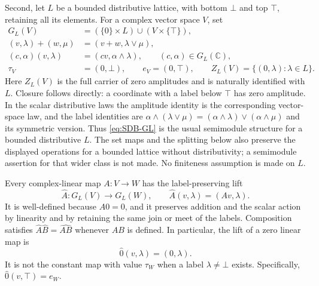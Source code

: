 Second, let $L$ be a bounded distributive lattice, with bottom
$\bot$ and top $\top$, retaining all its elements. For a complex
vector space $V$, set
\begin{equation}\tag{SDB33}\label{eq:SDB-GL}
 \begin{aligned}
 G_L(V)&=(\{0\}\times L)\cup(V\times\{\top\}),\\
 (v,\lambda)+(w,\mu)&=(v+w,\lambda\vee\mu),\\
 (c,\alpha)(v,\lambda)&=(cv,\alpha\wedge\lambda),
          \qquad(c,\alpha)\in G_L(\mathbb C),\\
 \tau_V&=(0,\bot),\qquad e_V=(0,\top),\qquad
 Z_L(V)=\{(0,\lambda):\lambda\in L\}.
 \end{aligned}
\end{equation}
Here $Z_L(V)$ is the full carrier of zero amplitudes and is naturally
identified with $L$. Closure follows directly: a coordinate with a
label below $\top$ has zero amplitude. In the scalar distributive
laws the amplitude identity is the corresponding vector-space law,
and the label identities are
$\alpha\wedge(\lambda\vee\mu)
=(\alpha\wedge\lambda)\vee(\alpha\wedge\mu)$ and its symmetric
version. Thus \eqref{eq:SDB-GL} is the usual semimodule structure
for a bounded distributive $L$. The set maps and the splitting below
also preserve the displayed operations for a bounded lattice without
distributivity; a semimodule assertion for that wider class is not
made. No finiteness assumption is made on $L$.

Every complex-linear map $A:V\to W$ has the label-preserving lift
\begin{equation}\tag{SDB34}\label{eq:SDB-linearlift}
 \widehat A:G_L(V)\longrightarrow G_L(W),\qquad
 \widehat A(v,\lambda)=(Av,\lambda).
\end{equation}
It is well-defined because $A0=0$, and it preserves addition and the
scalar action by linearity and by retaining the same join or meet of
the labels. Composition satisfies
$\widehat A\widehat B=\widehat{AB}$ whenever $AB$ is defined.
In particular, the lift of a zero linear map is
\begin{equation}\tag{SDB35}\label{eq:SDB-supportedzero}
 \widehat0(v,\lambda)=(0,\lambda).
\end{equation}
It is not the constant map with value $\tau_W$ when a label
$\lambda\ne\bot$ exists. Specifically, $\widehat0(v,\top)=e_W$.


